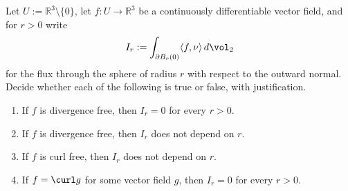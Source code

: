 \begin{exercise}
\label{ex:flux_through_nested_spheres}
Let $U := \mathbb{R}^3\setminus\{0\}$, let $f : U \to \mathbb{R}^3$ be a continuously
differentiable vector field, and for $r > 0$ write
\[I_r := \int_{\partial B_r(0)}\langle f,\nu\rangle\,d\vol_2\]
for the flux through the sphere of radius $r$ with respect to the outward normal. Decide whether
each of the following is true or false, with justification.
\begin{enumerate}[label=\textbf{(\alph*)}]
  \item If $f$ is divergence free, then $I_r = 0$ for every $r > 0$.
  \item If $f$ is divergence free, then $I_r$ does not depend on $r$.
  \item If $f$ is curl free, then $I_r$ does not depend on $r$.
  \item If $f = \curl g$ for some vector field $g$, then $I_r = 0$ for every $r > 0$.
\end{enumerate}
\end{exercise}

